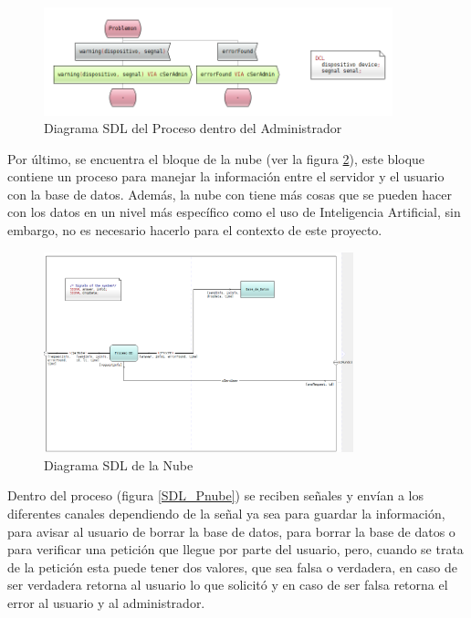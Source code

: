 \begin{figure}[h]
    \centering
    \includegraphics[width=0.9\textwidth]{images/SDL_ProcesoSerAdmi.png}
    \caption{Diagrama SDL del Proceso dentro del Administrador}
    \label{SDL_Padmin}
\end{figure}

Por último, se encuentra el bloque de la nube (ver la figura \ref{SDL_Nube}), este bloque contiene un proceso para manejar la información entre el servidor y el usuario con la base de datos. Además, la nube con tiene más cosas que se pueden hacer con los datos en un nivel más específico como el uso de Inteligencia Artificial, sin embargo, no es necesario hacerlo para el contexto de este proyecto.

\begin{figure}[h]
    \centering
    \includegraphics[width=0.8\textwidth]{images/SDL_Nube.png}
    \caption{Diagrama SDL de la Nube}
    \label{SDL_Nube}
\end{figure}

Dentro del proceso (figura \ref{SDL_Pnube}) se reciben señales y envían a los diferentes canales dependiendo de la señal ya sea para guardar la información, para avisar al usuario de borrar la base de datos, para borrar la base de datos o para verificar una petición que llegue por parte del usuario, pero, cuando se trata de la petición esta puede tener dos valores, que sea falsa o verdadera, en caso de ser verdadera retorna al usuario lo que solicitó y en caso de ser falsa retorna el error al usuario y al administrador.

